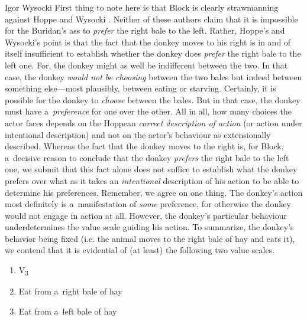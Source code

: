 \begin{artengenv}{Igor Wysocki}
First thing to note here is that Block is clearly strawmanning against Hoppe 
\parencite*[][]{hoppe_must_2005} %
 and Wysocki 
\parencite*[][]{wysocki_problem_2021}. %
 Neither of these authors claim that it is impossible for the Buridan's ass to \textit{prefer} the right bale to the left. Rather, Hoppe's and Wysocki's point is that the fact that the donkey moves to his right is in and of itself insufficient to establish whether the donkey does \textit{prefer} the right bale to the left one. For, the donkey might as well be indifferent between the two. In that case, the donkey \textit{would not be choosing} between the two bales but indeed between something else---most plausibly, between eating or starving. Certainly, it is possible for the donkey to \textit{choose} between the bales. But in that case, the donkey must have a~\textit{preference} for one over the other. All in all, how many choices the actor faces depends on the Hoppean 
\parencite*[][]{hoppe_must_2005} %
 \textit{correct description of action} (or action under intentional description) and not on the actor's behaviour as extensionally described. Whereas the fact that the donkey moves to the right is, for Block, a~decisive reason to conclude that the donkey \textit{prefers} the right bale to the left one, we submit that this fact alone does not suffice to establish what the donkey prefers over what as it takes an \textit{intentional} description of his action to be able to determine his preferences. Remember, we agree on one thing. The donkey's action most definitely is a~manifestation of \textit{some} preference, for otherwise the donkey would not engage in action at all. However, the donkey's particular behaviour underdetermines the value scale guiding his action. To summarize, the donkey's behavior being fixed (i.e. the animal moves to the right bale of hay and eats it), we contend that it is evidential of (at least) the following two value scales.






\begin{enumerate}[label=(\arabic*)]

\item[]\makebox[-1.7em][l]{}V\textsubscript{3}

\item Eat from a~right bale of hay

\item Eat from a~left bale of hay


\end{enumerate}
\end{artengenv}

